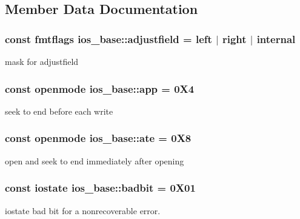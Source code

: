 \subsection{Member Data Documentation}
\subsubsection[{\texorpdfstring{adjustfield}{adjustfield}}]{\setlength{\rightskip}{0pt plus 5cm}const {\bf fmtflags} ios\+\_\+base\+::adjustfield = {\bf left} $\vert$ {\bf right} $\vert$ {\bf internal}\hspace{0.3cm}{\ttfamily [static]}}\hypertarget{classios__base_adaaf735381254aa096ebe3605e8bbd0a}{}\label{classios__base_adaaf735381254aa096ebe3605e8bbd0a}
mask for adjustfield 
\subsubsection[{\texorpdfstring{app}{app}}]{\setlength{\rightskip}{0pt plus 5cm}const {\bf openmode} ios\+\_\+base\+::app = 0\+X4\hspace{0.3cm}{\ttfamily [static]}}\hypertarget{classios__base_a8380aac3c405730708888fdc68905820}{}\label{classios__base_a8380aac3c405730708888fdc68905820}
seek to end before each write 
\subsubsection[{\texorpdfstring{ate}{ate}}]{\setlength{\rightskip}{0pt plus 5cm}const {\bf openmode} ios\+\_\+base\+::ate = 0\+X8\hspace{0.3cm}{\ttfamily [static]}}\hypertarget{classios__base_aa434355c165500065276d955d8b36e99}{}\label{classios__base_aa434355c165500065276d955d8b36e99}
open and seek to end immediately after opening 
\subsubsection[{\texorpdfstring{badbit}{badbit}}]{\setlength{\rightskip}{0pt plus 5cm}const {\bf iostate} ios\+\_\+base\+::badbit = 0\+X01\hspace{0.3cm}{\ttfamily [static]}}\hypertarget{classios__base_ac8c2c8f2f6bc9e6ce101c20e88ebce35}{}\label{classios__base_ac8c2c8f2f6bc9e6ce101c20e88ebce35}
iostate bad bit for a nonrecoverable error. 
